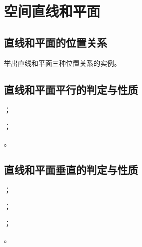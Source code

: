 \section{空间直线和平面}
\subsection{直线和平面的位置关系}
\begin{Practice}
  \begin{question}
    \item 
    \item 举出直线和平面三种位置关系的实例。
  \end{question}
\end{Practice}
\subsection{直线和平面平行的判定与性质}
\begin{Practice}
  \begin{question}
    \item ；
    \item ；
    \item 。
  \end{question}
\end{Practice}
\begin{Exercise}
  \begin{question}
    \item 
    \item 
    \item 
    \item 
    \item 
    \item 
    \item 
    \item 
    \item 
    \item 
  \end{question}
\end{Exercise}
\subsection{直线和平面垂直的判定与性质}
\begin{Practice}
  \begin{question}
    \item ；
    \item ；
    \item ；
    \item 。
  \end{question}
\end{Practice}
